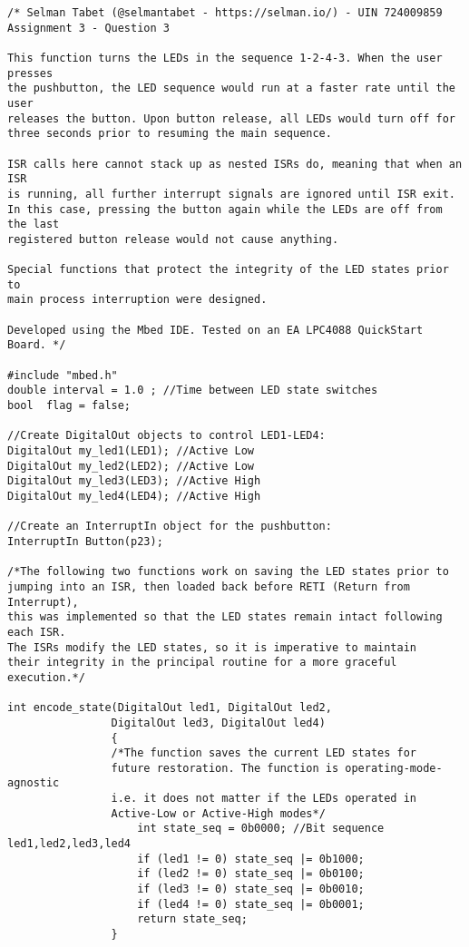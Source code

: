 \documentclass{article}
\begin{document}
\begin{verbatim}
/* Selman Tabet (@selmantabet - https://selman.io/) - UIN 724009859
Assignment 3 - Question 3

This function turns the LEDs in the sequence 1-2-4-3. When the user presses
the pushbutton, the LED sequence would run at a faster rate until the user
releases the button. Upon button release, all LEDs would turn off for
three seconds prior to resuming the main sequence.

ISR calls here cannot stack up as nested ISRs do, meaning that when an ISR
is running, all further interrupt signals are ignored until ISR exit.
In this case, pressing the button again while the LEDs are off from the last
registered button release would not cause anything.

Special functions that protect the integrity of the LED states prior to
main process interruption were designed.

Developed using the Mbed IDE. Tested on an EA LPC4088 QuickStart Board. */

#include "mbed.h"
double interval = 1.0 ; //Time between LED state switches
bool  flag = false;

//Create DigitalOut objects to control LED1-LED4:
DigitalOut my_led1(LED1); //Active Low
DigitalOut my_led2(LED2); //Active Low
DigitalOut my_led3(LED3); //Active High
DigitalOut my_led4(LED4); //Active High

//Create an InterruptIn object for the pushbutton:
InterruptIn Button(p23);

/*The following two functions work on saving the LED states prior to 
jumping into an ISR, then loaded back before RETI (Return from Interrupt),
this was implemented so that the LED states remain intact following each ISR.
The ISRs modify the LED states, so it is imperative to maintain
their integrity in the principal routine for a more graceful execution.*/

int encode_state(DigitalOut led1, DigitalOut led2, 
                DigitalOut led3, DigitalOut led4)
                {
                /*The function saves the current LED states for 
                future restoration. The function is operating-mode-agnostic
                i.e. it does not matter if the LEDs operated in
                Active-Low or Active-High modes*/
                    int state_seq = 0b0000; //Bit sequence led1,led2,led3,led4
                    if (led1 != 0) state_seq |= 0b1000;
                    if (led2 != 0) state_seq |= 0b0100;
                    if (led3 != 0) state_seq |= 0b0010;
                    if (led4 != 0) state_seq |= 0b0001;
                    return state_seq;
                }
                

\end{verbatim}
\end{document}
